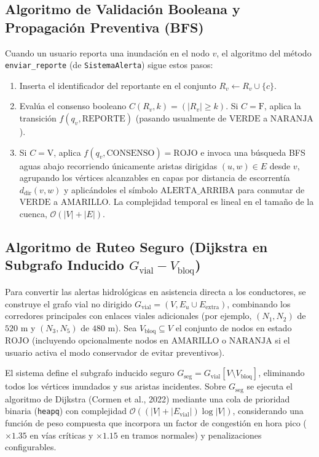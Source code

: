 \documentclass[12pt,letterpaper]{article}
\begin{document}
\subsection{Algoritmo de Validación Booleana y Propagación Preventiva (BFS)}

{\sloppy Cuando un usuario reporta una inundación en el nodo $v$, el algoritmo del método \texttt{enviar\_reporte} (de \texttt{SistemaAlerta}) sigue estos pasos:\par}
\begin{enumerate}[leftmargin=2.0cm]
    \item Inserta el identificador del reportante en el conjunto $R_v \leftarrow R_v \cup \{c\}$.
    \item Evalúa el consenso booleano $C(R_v, k) = (|R_v| \ge k)$. Si $C = \text{F}$, aplica la transición $f(q_v, \text{REPORTE})$ (pasando usualmente de $\text{VERDE}$ a $\text{NARANJA}$).
    \item Si $C = \text{V}$, aplica $f(q_v, \text{CONSENSO}) = \text{ROJO}$ e invoca una búsqueda BFS aguas abajo recorriendo únicamente aristas dirigidas $(u, w) \in E$ desde $v$, agrupando los vértices alcanzables en capas por distancia de escorrentía $d_{\text{dir}}(v, w)$ y aplicándoles el símbolo $\text{ALERTA\_ARRIBA}$ para conmutar de $\text{VERDE}$ a $\text{AMARILLO}$. La complejidad temporal es lineal en el tamaño de la cuenca, $\mathcal{O}(|V| + |E|)$.
\end{enumerate}

\subsection{Algoritmo de Ruteo Seguro (Dijkstra en Subgrafo Inducido $G_{\text{vial}} - V_{\text{bloq}}$)}

Para convertir las alertas hidrológicas en asistencia directa a los conductores, se construye el grafo vial no dirigido $G_{\text{vial}} = (V, E_u \cup E_{\text{extra}})$, combinando los corredores principales con enlaces viales adicionales (por ejemplo, $(N_1, N_2)$ de $520\text{ m}$ y $(N_3, N_5)$ de $480\text{ m}$). Sea $V_{\text{bloq}} \subseteq V$ el conjunto de nodos en estado $\text{ROJO}$ (incluyendo opcionalmente nodos en $\text{AMARILLO}$ o $\text{NARANJA}$ si el usuario activa el modo conservador de evitar preventivos).

El sistema define el subgrafo inducido seguro $G_{\text{seg}} = G_{\text{vial}}[V \setminus V_{\text{bloq}}]$, eliminando todos los vértices inundados y sus aristas incidentes. Sobre $G_{\text{seg}}$ se ejecuta el algoritmo de Dijkstra (Cormen et al., 2022) mediante una cola de prioridad binaria (\texttt{heapq}) con complejidad $\mathcal{O}((|V| + |E_{\text{vial}}|) \log |V|)$, considerando una función de peso compuesta que incorpora un factor de congestión en hora pico ($\times 1.35$ en vías críticas y $\times 1.15$ en tramos normales) y penalizaciones configurables.
\end{document}
